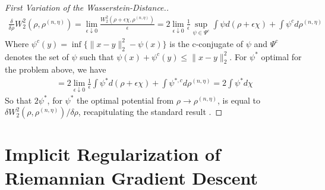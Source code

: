 \documentclass[reqno,11pt,letterpaper]{amsart}
\theoremstyle{plain}
\theoremstyle{definition}
\theoremstyle{remark}
\begin{document}
\begin{proof}[First Variation of the Wasserstein-Distance.]\label{proof:first_var}
\begin{align*}
    \frac{\delta}{\delta \rho} W_{2}^{2}(\rho, \rho^{(n,\eta)}) = \lim_{\epsilon \downarrow 0} \frac{W_{2}^{2}(\rho + \epsilon \chi, \rho^{(n,\eta)})}{\epsilon} = 2 \lim_{\epsilon \downarrow 0} \frac{1}{\epsilon} \sup_{\psi \in \Psi^{c}} \int \psi d(\rho + \epsilon \chi) + \int \psi^{c} d\rho^{(n,\eta)}
\end{align*}
Where $\psi^{c}(y) = \inf\{ \lVert x - y \rVert_{2}^{2} - \psi(x) \}$ is the c-conjugate of $\psi$ and $\Psi^{c}$ denotes the set of $\psi$ such that $\psi(x) + \psi^{c}(y) \leq \lVert x - y \rVert_{2}^{2}$. For $\psi^{*}$ optimal for the problem above, we have
\begin{align*}
    = 2 \lim_{\epsilon \downarrow 0} \frac{1}{\epsilon} \int \psi^{*} d(\rho + \epsilon \chi) + \int \psi^{*,c} d\rho^{(n,\eta)} = 2 \int \psi^{*} d\chi
\end{align*}
So that $2 \psi^{*}$, for $\psi^{*}$ the optimal potential from $\rho \to \rho^{(n,\eta)}$, is equal to $\delta W_{2}^{2}(\rho, \rho^{(n,\eta)})/\delta \rho$, recapitulating the standard result \cite{AGS2008, Jordan1998, chewi2024statistical}.
\end{proof}



\section{Implicit Regularization of Riemannian Gradient Descent}\label{sec:Riemann_IR}
\end{document}
